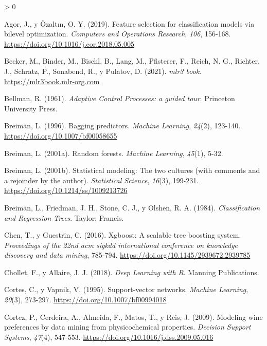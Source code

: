 \documentclass[
  spanish,
]{book}
\theoremstyle{break}
\newlength{\cslhangindent}
\newenvironment{CSLReferences}[2] %
 {%
  \setlength{\parindent}{0pt}
  \ifodd #1 \everypar{\setlength{\hangindent}{\cslhangindent}}\ignorespaces\fi
  \ifnum #2 > 0
  \setlength{\parskip}{#2\baselineskip}
  \fi
 }%
 {}
\theoremstyle{definition}
\theoremstyle{definition}
\theoremstyle{definition}
\theoremstyle{definition}
\theoremstyle{remark}
\begin{document}
\hypertarget{refs}{}
\begin{CSLReferences}{1}{0}
\leavevmode\hypertarget{ref-agor2019feature}{}%
Agor, J., y Özaltın, O. Y. (2019). Feature selection for classification models via bilevel optimization. \emph{Computers and Operations Research}, \emph{106}, 156-168. \url{https://doi.org/10.1016/j.cor.2018.05.005}

\leavevmode\hypertarget{ref-becker2021mlr3}{}%
Becker, M., Binder, M., Bischl, B., Lang, M., Pfisterer, F., Reich, N. G., Richter, J., Schratz, P., Sonabend, R., y Pulatov, D. (2021). \emph{mlr3 book}. \url{https://mlr3book.mlr-org.com}

\leavevmode\hypertarget{ref-bellman1961adaptive}{}%
Bellman, R. (1961). \emph{Adaptive Control Processes: a guided tour}. Princeton University Press.

\leavevmode\hypertarget{ref-breiman1996bagging}{}%
Breiman, L. (1996). Bagging predictors. \emph{Machine Learning}, \emph{24}(2), 123-140. \url{https://doi.org/10.1007/bf00058655}

\leavevmode\hypertarget{ref-breiman2001random}{}%
Breiman, L. (2001a). Random forests. \emph{Machine Learning}, \emph{45}(1), 5-32.

\leavevmode\hypertarget{ref-breiman2001statistical}{}%
Breiman, L. (2001b). Statistical modeling: The two cultures (with comments and a rejoinder by the author). \emph{Statistical Science}, \emph{16}(3), 199-231. \url{https://doi.org/10.1214/ss/1009213726}

\leavevmode\hypertarget{ref-breiman1984classification}{}%
Breiman, L., Friedman, J. H., Stone, C. J., y Olshen, R. A. (1984). \emph{Classification and Regression Trees}. Taylor; Francis.

\leavevmode\hypertarget{ref-chen2016xgboost}{}%
Chen, T., y Guestrin, C. (2016). Xgboost: A scalable tree boosting system. \emph{Proceedings of the 22nd acm sigkdd international conference on knowledge discovery and data mining}, 785-794. \url{https://doi.org/10.1145/2939672.2939785}

\leavevmode\hypertarget{ref-chollet2018deep}{}%
Chollet, F., y Allaire, J. J. (2018). \emph{Deep Learning with R}. Manning Publications.

\leavevmode\hypertarget{ref-cortes1995support}{}%
Cortes, C., y Vapnik, V. (1995). Support-vector networks. \emph{Machine Learning}, \emph{20}(3), 273-297. \url{https://doi.org/10.1007/bf00994018}

\leavevmode\hypertarget{ref-cortez2009modeling}{}%
Cortez, P., Cerdeira, A., Almeida, F., Matos, T., y Reis, J. (2009). Modeling wine preferences by data mining from physicochemical properties. \emph{Decision Support Systems}, \emph{47}(4), 547-553. \url{https://doi.org/10.1016/j.dss.2009.05.016}


\end{CSLReferences}
\end{document}
